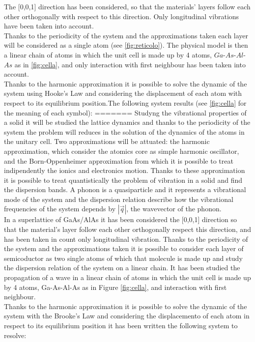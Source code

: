 \documentclass{article}
\begin{document}
The [0,0,1] direction has been considered, so that the materials' layers follow each other orthogonally with respect to this direction. Only longitudinal vibrations have been taken into account. \\
Thanks to the periodicity of the system and the approximations taken each layer will be considered as a single atom (see \autoref{fig:reticolo}). The physical model is then a linear chain of atoms in which the unit cell is made up by 4 atoms, $Ga$-$As$-$Al$-$As$ as in \autoref{fig:cella}, and only interaction with first neighbour has been taken into account. \\
Thanks to the harmonic approximation it is possible to solve the dynamic of the system using Hooke's Law and considering the displacement of each atom with respect to its equilibrium position.The following system results (see \autoref{fig:cella} for the meaning of each symbol):
=======
Studyng the vibrational properties of a solid it will be studied the lattice dynamics and thanks to the periodicity of the system the problem will reduces in the solution of the dynamics of the atoms in the unitary cell. Two approximations will be attuated: the harmonic approximation, which consider the atomics core as simple harmonic oscillator, and the Born-Oppenheimer approximation from which it is possible to treat indipendently the ionics and electronics motion. Thanks to these approximation it is possible to treat quantistically the problem of vibration in a solid and find the dispersion bands. A phonon is a quasiparticle and it represents a vibrational mode of the system and the dispersion relation describe how the vibrational frequencies of the system depends by $|\vec{q}|$, the wavevector of the phonon. \\
In a superlattice of GaAs/AlAs it has been considered the [0,0,1] direction so that the material's layer follow each other orthogonally respect this direction, and has been taken in count only longitudinal vibration. Thanks to the periodicity of the system and the approximations taken it is possible to consider each layer of semicoductor as two single atoms of which that molecule is made up and study the dispersion relation of the system on a linear chain. It has been studied the propagation of a wave in a linear chain of atoms in which the unit cell is made up by 4 atoms, Ga-As-Al-As as in Figure \ref{fig:cella}, and interaction with first neighbour. \\
Thanks to the harmonic approximation it is possible to solve the dynamic of the system with the Brooke's Law and considering the displacemento of each atom in respect to its equilibrium position it has been written the following system to resolve:
\end{document}
